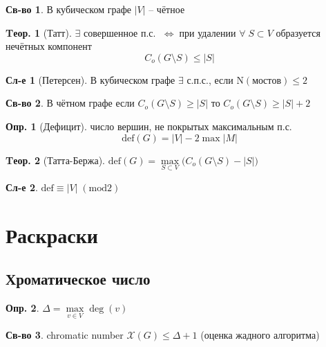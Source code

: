\documentclass[a4paper,12pt]{article}
\numberwithin{figure}{section}
\theoremstyle{definition}
\newtheorem{definition}{Опр.}[section]
\newtheorem*{property}{Св-во}  %
\theoremstyle{definition}
\newtheorem{theorem}{Tеор.}[section]
\newtheorem*{corollary}{Сл-е} %
\def\iiff{$\;\Longleftrightarrow\;$}
\def\iiChi{\mathcal{X}}
\def\iiany{$\forall\;$}
\begin{document}
\begin{property}
	В кубическом графе $|V|$ -- чётное
\end{property}

\begin{theorem}[Татт]
	$\exists$ совершенное п.с. \iiff при удалении \iiany $S \subset V$ образуется нечётных компонент
	\[ C_{o}(G \setminus S) \leqslant |S| \]
\end{theorem}

\begin{corollary}[Петерсен]
	В кубическом графе $\exists$ с.п.с., если $\mathrm{N}(мостов) \leqslant 2$
\end{corollary}

\begin{property}
В чётном графе если $C_{o}(G \setminus S) \ge |S|$ то $C_{o}(G \setminus S) \geqslant |S|+2$
\end{property}

\begin{definition}[Дефицит]
	число вершин, не покрытых максимальным п.с.
	\[ \mathrm{def}(G)=|V|-2\max|M| \]
\end{definition}

\begin{theorem}[Татта-Бержа]
	$ \mathrm{def}(G) = \max\limits_{S \subset V} \big( C_{o}(G \setminus S) - \left|S\right| \big) $
\end{theorem}

\begin{corollary}
	$ \mathrm{def} \equiv |V| \; (\mathrm{mod} 2) $
\end{corollary}



\section{Раскраски}


\subsection{Хроматическое число}


\begin{definition} $\Delta = \max \limits_{v \in V} \deg(v)$ \end{definition}

\begin{property}
	chromatic number $\iiChi(G) \leqslant \Delta + 1$ (оценка жадного алгоритма)
\end{property}
\end{document}
